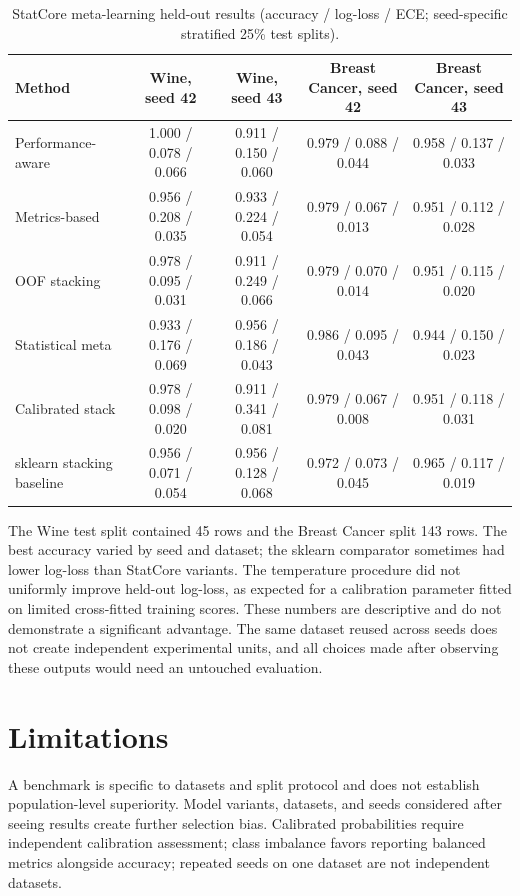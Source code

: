 ﻿\documentclass[conference]{IEEEtran}
\begin{document}
\begin{table}[t]
\caption{StatCore meta-learning held-out results (accuracy / log-loss / ECE; seed-specific stratified 25\% test splits).}
\label{tab:meta-results}
\centering\small
\begin{tabular}{lcccc}
\toprule
Method & Wine, seed 42 & Wine, seed 43 & Breast Cancer, seed 42 & Breast Cancer, seed 43\\
\midrule
Performance-aware & 1.000 / 0.078 / 0.066 & 0.911 / 0.150 / 0.060 & 0.979 / 0.088 / 0.044 & 0.958 / 0.137 / 0.033\\
Metrics-based & 0.956 / 0.208 / 0.035 & 0.933 / 0.224 / 0.054 & 0.979 / 0.067 / 0.013 & 0.951 / 0.112 / 0.028\\
OOF stacking & 0.978 / 0.095 / 0.031 & 0.911 / 0.249 / 0.066 & 0.979 / 0.070 / 0.014 & 0.951 / 0.115 / 0.020\\
Statistical meta & 0.933 / 0.176 / 0.069 & 0.956 / 0.186 / 0.043 & 0.986 / 0.095 / 0.043 & 0.944 / 0.150 / 0.023\\
Calibrated stack & 0.978 / 0.098 / 0.020 & 0.911 / 0.341 / 0.081 & 0.979 / 0.067 / 0.008 & 0.951 / 0.118 / 0.031\\
sklearn stacking baseline & 0.956 / 0.071 / 0.054 & 0.956 / 0.128 / 0.068 & 0.972 / 0.073 / 0.045 & 0.965 / 0.117 / 0.019\\
\bottomrule
\end{tabular}
\end{table}
The Wine test split contained 45 rows and the Breast Cancer split 143 rows. The best accuracy varied by seed and dataset; the sklearn comparator sometimes had lower log-loss than StatCore variants. The temperature procedure did not uniformly improve held-out log-loss, as expected for a calibration parameter fitted on limited cross-fitted training scores. These numbers are descriptive and do not demonstrate a significant advantage. The same dataset reused across seeds does not create independent experimental units, and all choices made after observing these outputs would need an untouched evaluation.

\section{Limitations}
A benchmark is specific to datasets and split protocol and does not establish population-level superiority. Model variants, datasets, and seeds considered after seeing results create further selection bias. Calibrated probabilities require independent calibration assessment; class imbalance favors reporting balanced metrics alongside accuracy; repeated seeds on one dataset are not independent datasets.
\end{document}
